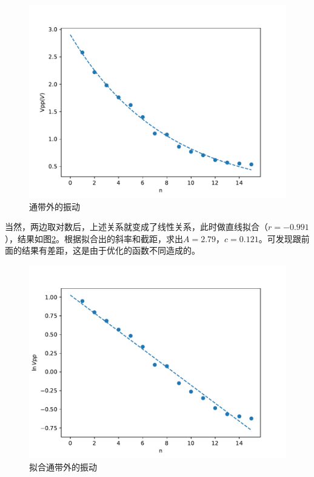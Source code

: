 \documentclass[fleqn,10pt]{SelfArx} %
\begin{document}
\begin{figure}[htbp]
	\centering
	\includegraphics[width=\linewidth]{0680.pdf}
	\caption{通带外的振动}
	\label{fig:0680}
\end{figure}

当然，两边取对数后，上述关系就变成了线性关系，此时做直线拟合（$r=-0.991$），结果如图\ref{fig:0680l}。根据拟合出的斜率和截距，求出$A=2.79$，$c=0.121$。可发现跟前面的结果有差距，这是由于优化的函数不同造成的。

\begin{figure}[htbp]
	\centering
	\includegraphics[width=\linewidth]{0680fit.pdf}
	\caption{拟合通带外的振动}
	\label{fig:0680l}
\end{figure}
\end{document}
